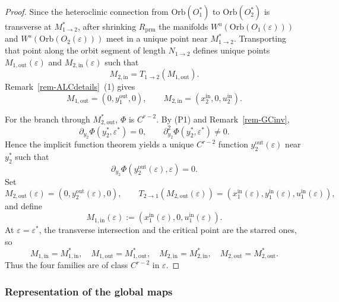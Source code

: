 \documentclass[11pt,a4paper]{article}
\theoremstyle{plain}
\theoremstyle{definition}
\newtheorem{remark}[theorem]{Remark}
\theoremstyle{plain}
\numberwithin{equation}{section}
\begin{document}
\begin{proof}
Since the heteroclinic connection from $\mathrm{Orb}(O_1^*)$ to $\mathrm{Orb}(O_2^*)$ is transverse at $M_{1 \to 2}^*$, after shrinking $R_\mathrm{prm}$ the manifolds $W^u(\mathrm{Orb}(O_1(\varepsilon)))$ and $W^s(\mathrm{Orb}(O_2(\varepsilon)))$ meet in a unique point near $M_{1 \to 2}^*$. Transporting that point along the orbit segment of length $N_{1 \to 2}$ defines unique points $M_{1,\mathrm{out}}(\varepsilon)$ and $M_{2,\mathrm{in}}(\varepsilon)$ such that
\[
M_{2,\mathrm{in}} = T_{1 \to 2}(M_{1,\mathrm{out}}).
\]
Remark~\ref{rem-ALCdetails}~(1) gives
\[
M_{1,\mathrm{out}} = (0,y_1^\mathrm{out},0),
\qquad
M_{2,\mathrm{in}} = (x_2^\mathrm{in},0,u_2^\mathrm{in}).
\]

For the branch through $M_{2,\mathrm{out}}^*$, $\Phi$ is $C^{r-2}$. By \textup{(P1)} and Remark~\ref{rem-GCinv},
\[
\partial_{y_2}\Phi(y_2^*,\varepsilon^*) = 0,
\qquad
\partial_{y_2}^2\Phi(y_2^*,\varepsilon^*) \neq 0.
\]
Hence the implicit function theorem yields a unique $C^{r-2}$ function $y_2^\mathrm{out}(\varepsilon)$ near $y_2^*$ such that
\[
\partial_{y_2}\Phi(y_2^\mathrm{out}(\varepsilon),\varepsilon) = 0.
\]
Set
\[
M_{2,\mathrm{out}}(\varepsilon) = (0,y_2^\mathrm{out}(\varepsilon),0),
\qquad
T_{2 \to 1}(M_{2,\mathrm{out}}(\varepsilon)) = (x_1^\mathrm{in}(\varepsilon),y_1^\mathrm{in}(\varepsilon),u_1^\mathrm{in}(\varepsilon)),
\]
and define
\[
M_{1,\mathrm{in}}(\varepsilon) := (x_1^\mathrm{in}(\varepsilon),0,u_1^\mathrm{in}(\varepsilon)).
\]
At $\varepsilon = \varepsilon^*$, the transverse intersection and the critical point are the starred ones, so
\[
M_{1,\mathrm{in}} = M_{1,\mathrm{in}}^*,
\quad
M_{1,\mathrm{out}} = M_{1,\mathrm{out}}^*,
\quad
M_{2,\mathrm{in}} = M_{2,\mathrm{in}}^*,
\quad
M_{2,\mathrm{out}} = M_{2,\mathrm{out}}^*.
\]
Thus the four families are of class $C^{r-2}$ in $\varepsilon$.
\end{proof}


\subsubsection{Representation of the global maps}
\end{document}
